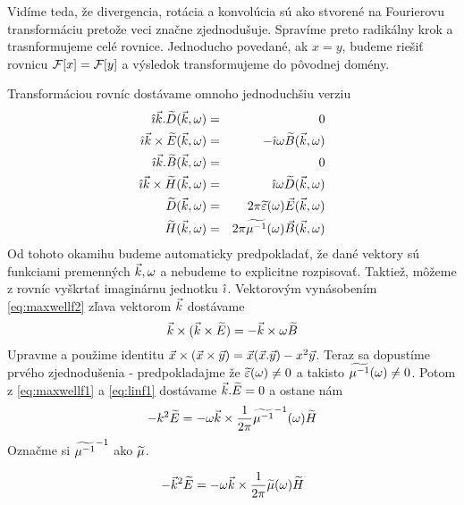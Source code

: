 Vidíme teda, že divergencia, rotácia a konvolúcia sú ako stvorené na
Fourierovu transformáciu pretože veci značne zjednodušuje. Spravíme
preto radikálny krok a trasnformujeme celé rovnice. Jednoducho
povedané, ak $x=y$, budeme riešiť rovnicu $\mathcal{F}[x]=\mathcal{F}[y]$ a
výsledok transformujeme do pôvodnej domény.

Transformáciou rovníc dostávame omnoho jednoduchšiu verziu
\begin{eqnarray}
\hat{\imath} \vec{k} . \widetilde{D}{(\vec{k},\omega)} &=& 0 \label{eq:maxwellf1} \\
\hat{\imath} \vec{k} \times \widetilde{E}{(\vec{k},\omega)} &=& - \hat{\imath} \omega \widetilde{B}{(\vec{k},\omega)}
\label{eq:maxwellf2} \\
\hat{\imath} \vec{k} . \widetilde{B}{(\vec{k},\omega)} &=& 0 \label{eq:maxwellf3}\\
\hat{\imath} \vec{k} \times \widetilde{H}{(\vec{k},\omega)} &=& \hat{\imath} \omega \widetilde{D}{(\vec{k},\omega)} \label{eq:maxwellf4}\\
\widetilde{D}{(\vec{k},\omega)} &=& 2 \pi \widetilde{\varepsilon}(\omega) \vec{E}{(\vec{k},\omega)} \label{eq:linf1}\\
\widetilde{H}{(\vec{k},\omega)} &=& 2 \pi \widetilde{\mu^{-1}}(\omega) \vec{B}{(\vec{k},\omega)}
\label{eq:linf2}
\end{eqnarray}
Od tohoto okamihu budeme automaticky predpokladať, že dané vektory sú
funkciami premenných $\vec{k},\omega$ a nebudeme to explicitne
rozpisovať.
Taktiež, môžeme z rovníc vyškrtať imaginárnu jednotku $\hat{\imath}$.
Vektorovým vynásobením \ref{eq:maxwellf2} zľava vektorom $\vec{k}$
dostávame
\begin{equation*}
    \vec{k} \times (\vec{k} \times \widetilde{E}) = - \vec{k}\times
    \omega \widetilde{B}
\end{equation*}
Upravme a použime identitu $\vec{x} \times (\vec{x} \times
\vec{y}) = \vec{x} (\vec{x} . \vec{y}) - x^2
\vec{y}$. Teraz sa dopustíme prvého zjednodušenia - predpokladajme
že $\widetilde{\varepsilon}(\omega)\not=0$ a takisto
$\widetilde{\mu^{-1}}(\omega)\not=0$. Potom z \ref{eq:maxwellf1} a \ref{eq:linf1} dostávame
$\vec{k}.\widetilde{E}=0$ a ostane nám
\begin{equation*}
    - k^2 \widetilde{E} = - \omega \vec{k} \times
    \frac{1}{2 \pi} \widetilde{\mu^{-1}}^{-1}(\omega) \widetilde{H}
\end{equation*}
Označme si $\widetilde{\mu^{-1}}^{-1}$ ako $\widetilde{\mu}$.

\begin{equation*}
    - \vec{k}^2 \widetilde{E} = - \omega \vec{k} \times
    \frac{1}{2 \pi} \widetilde{\mu}(\omega) \widetilde{H}
\end{equation*}

